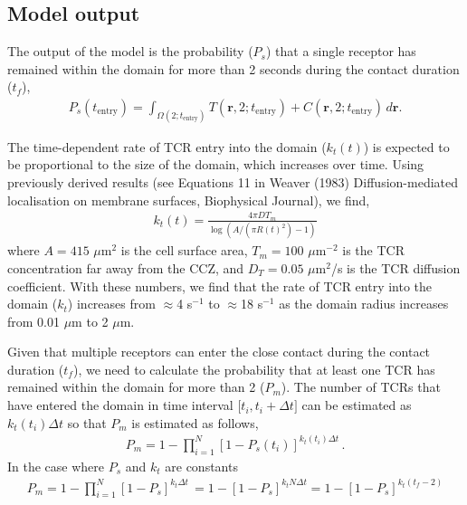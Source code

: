 \documentclass[11pt]{article}
\newcommand{\jt}[1]{\textcolor{black}{#1}}
\begin{document}
\subsection*{Model output}

The output of the model is the probability ($P_s$) that a single receptor has remained within the domain for more than 2 seconds during the contact duration ($t_f$),
\begin{eqnarray}
P_s(t_\textrm{entry}) = \int_{\Omega(2;t_\textrm{entry})} \! T(\mathbf{r}, 2; t_\textrm{entry}) + C(\mathbf{r}, 2; t_\textrm{entry}) \, d\mathbf{r}.
\end{eqnarray}

The time-dependent rate of TCR entry into the domain ($k_t (t)$) is expected to be proportional to the size of the domain, which increases over time. Using previously derived results (see Equations 11 in Weaver (1983) Diffusion-mediated localisation on membrane surfaces, Biophysical Journal), we find,
\begin{eqnarray}
k_t(t) = \frac{4\pi D T_m}{\log(A / (\pi R(t)^2) - 1) }
\end{eqnarray}
where $A = 415$ $\mu$m$^2$ is the cell surface area, $T_m = 100$ $\mu$m$^{-2}$ is the TCR concentration far away from the CCZ, and $D_T = 0.05$ $\mu$m$^2$/s is the TCR diffusion coefficient. With these numbers, we find that the rate of TCR entry into the domain ($k_t$) increases from $\approx$4 s$^{-1}$ to $\approx$18 s$^{-1}$ as the domain radius increases from 0.01 $\mu$m to 2 $\mu$m.

Given that multiple receptors can enter the close contact during the contact duration ($t_f$), we need to calculate the probability that at least one TCR has remained within the domain for more than 2 ($P_m$). The number of TCRs that have entered the domain in time interval $\lbrack t_i, t_i + \Delta t\rbrack$ can be estimated as $k_t(t_i)\Delta t$ so that $P_m$ is estimated as follows,
\begin{eqnarray} \label{Pm}
P_m = 1 - \prod_{i=1}^{N} \left[ 1-P_s(t_i)\right]^{k_t(t_i)\Delta t} \,.
\end{eqnarray}
In the case where $P_s$ and $k_t$ are constants
\begin{eqnarray} \label{Pm}
P_m = 1 - \prod_{i=1}^{N} \left[ 1-P_s\right]^{k_t\Delta t} \, = 1 -  \left[ 1-P_s\right]^{k_tN\Delta t} = 1 - \left[ 1-P_s\right]^{k_t(t_f-2)}
\end{eqnarray}
\end{document}
